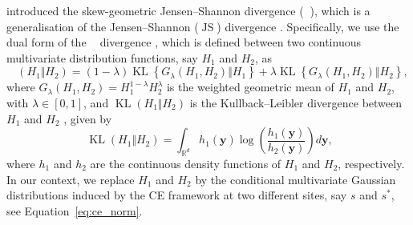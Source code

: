 \documentclass[12pt]{article}
\DeclareMathOperator{\KL}{\mathrm{KL}}
\DeclareMathOperator{\JS}{\mathrm{JS}}
\newcommand{\JSGa}{\mathop{\mathrm{JS}^{\mathrm{G}_{\lambda}}}\nolimits}
\begin{document}
\citet{Nielsen2019} introduced the skew-geometric Jensen--Shannon divergence ($\JSGa{}$), which is a generalisation of the Jensen--Shannon ($\JS{}$) divergence \citep{Lin1991}. 
Specifically, we use the dual form of the $\JSGa{}$ divergence \citep{Deasy2020}, which is defined between two continuous multivariate distribution functions, say $H_1$ and $H_2$, as 
\begin{equation}~\label{eq:jsga}
  \JSGa{(H_1 \Vert H_2)} = (1- \lambda) \KL{\left\{G_{\lambda}(H_1, H_2) \Vert H_1\right\}} + \lambda \KL{\left\{G_{\lambda}(H_1, H_2) \Vert H_2\right\}},
\end{equation}
where $G_{\lambda}(H_1, H_2) = H_{1}^{1-\lambda} H_{2}^{\lambda}$ is the weighted geometric mean of $H_1$ and $H_2$, with $\lambda \in [0, 1]$, and $\KL{(H_1 \Vert H_2)}$ is the Kullback--Leibler divergence between $H_1$ and $H_2$ \citep{Kullback1951}, given by 
\begin{equation}~\label{eq:kl}
  \KL{(H_1 \Vert H_2)} = \int_{\mathbb{R}^d} h_1(\symbf{y}) \log\left(\frac{h_1(\symbf{y})}{h_2(\symbf{y})}\right) d\symbf{y},
\end{equation}
where $h_1$ and $h_2$ are the continuous density functions of $H_1$ and $H_2$, respectively. 
In our context, we replace $H_1$ and $H_2$ by the conditional multivariate Gaussian distributions induced by the CE framework at two different sites, say $s$ and $s^*$, see Equation~\eqref{eq:ce_norm}.
\end{document}
